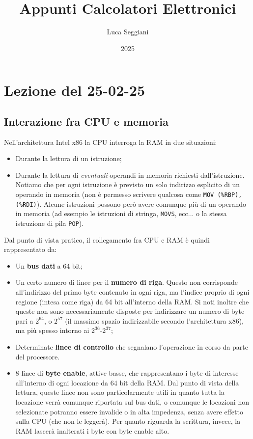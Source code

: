 \documentclass[a4paper,11pt]{article}
\title{Appunti Calcolatori Elettronici}
\author{Luca Seggiani}
\date{2025}
\begin{document}
\section{Lezione del 25-02-25}

\thispagestyle{empty}
\pagestyle{fancy}

\subsection{Interazione fra CPU e memoria}
Nell'architettura Intel x86 la CPU interroga la RAM in due situazioni:
\begin{itemize}
	\item Durante la lettura di un istruzione;
	\item Durante la lettura di \textit{eventuali} operandi in memoria richiesti dall'istruzione.
		Notiamo che per ogni istruzione è previsto un solo indirizzo esplicito di un operando in memoria (non è permesso scrivere qualcosa come \lstinline|MOV (%RBP), (%RDI)|). 
		Alcune istruzioni possono però avere comunque più di un operando in memoria (ad esempio le istruzioni di stringa, \lstinline|MOVS|, ecc... o la stessa istruzione di pila \lstinline|POP|).
\end{itemize}

Dal punto di vista pratico, il collegamento fra CPU e RAM è quindi rappresentato da:
\begin{itemize}
	\item Un \textbf{bus dati} a 64 bit;
	\item Un certo numero di linee per il \textbf{numero di riga}. Questo non corrisponde all'indirizzo del primo byte contenuto in ogni riga, ma l'indice proprio di ogni regione (intesa come riga) da 64 bit all'interno della RAM. Si noti inoltre che queste non sono necessariamente disposte per indirizzare un numero di byte pari a $2^{64}$, o $2^{57}$ (il massimo spazio indirizzabile secondo l'architettura x86), ma più spesso intorno ai $2^{36}$-$2^{37}$;
	\item Determinate \textbf{linee di controllo} che segnalano l'operazione in corso da parte del processore.
	\item 8 linee di \textbf{byte enable}, attive basse, che rappresentano i byte di interesse all'interno di ogni locazione da 64 bit della RAM. Dal punto di vista della lettura, queste linee non sono particolarmente utili in quanto tutta la locazione verrà comunque riportata sul bus dati, o comunque le locazioni non selezionate potranno essere invalide o in alta impedenza, senza avere effetto sulla CPU (che non le leggerà). Per quanto riguarda la scrittura, invece, la RAM lascerà inalterati i byte con byte enable alto. 
\end{itemize}
\end{document}
